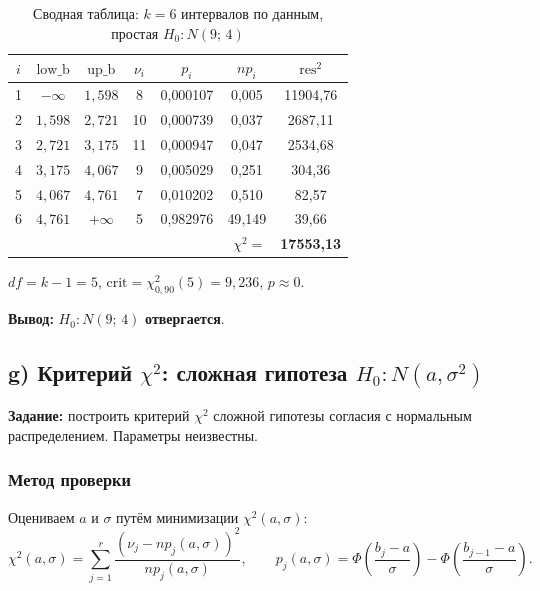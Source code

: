 \documentclass[12pt,a4paper]{article}
\begin{document}
\begin{table}[H]
	\centering
	\begin{tabular}{ccccccc}
		\toprule
		$i$ & $\mathrm{low\_b}$ & $\mathrm{up\_b}$ & $\nu_i$ & $p_i$ & $np_i$ & $\mathrm{res}^2$ \\
		\midrule
		1 & $-\infty$ & $1{,}598$ &  8 & 0{,}000107 &  0{,}005 & 11904{,}76 \\
		2 & $1{,}598$ & $2{,}721$ & 10 & 0{,}000739 &  0{,}037 &  2687{,}11 \\
		3 & $2{,}721$ & $3{,}175$ & 11 & 0{,}000947 &  0{,}047 &  2534{,}68 \\
		4 & $3{,}175$ & $4{,}067$ &  9 & 0{,}005029 &  0{,}251 &   304{,}36 \\
		5 & $4{,}067$ & $4{,}761$ &  7 & 0{,}010202 &  0{,}510 &    82{,}57 \\
		6 & $4{,}761$ & $+\infty$ &  5 & 0{,}982976 & 49{,}149 &    39{,}66 \\
		\bottomrule
		\multicolumn{6}{r}{$\chi^2 =$} & \textbf{17553{,}13} \\
	\end{tabular}
	\caption{Сводная таблица: $k=6$ интервалов по данным, простая $H_0\colon N(9;\,4)$}
\end{table}

$df=k-1=5$, $\mathrm{crit}=\chi^2_{0{,}90}(5)=9{,}236$, $p\approx 0$.

\textbf{Вывод:} $H_0\colon N(9;\,4)$ \textbf{отвергается}.
	
\subsection{g) Критерий \texorpdfstring{$\chi^2$}{chi2}: сложная гипотеза
	\texorpdfstring{$H_0\colon N(a,\sigma^2)$}{}}

\textbf{Задание:} построить критерий $\chi^2$ сложной гипотезы согласия
с нормальным распределением. Параметры неизвестны.

\subsubsection*{Метод проверки}

Оцениваем $a$ и $\sigma$ путём минимизации $\chi^2(a,\sigma)$:
\[
\chi^2(a,\sigma) = \sum_{j=1}^r \frac{(\nu_j - np_j(a,\sigma))^2}{np_j(a,\sigma)},
\qquad
p_j(a,\sigma) = \Phi\!\left(\frac{b_j-a}{\sigma}\right) - \Phi\!\left(\frac{b_{j-1}-a}{\sigma}\right).
\]
\end{document}
